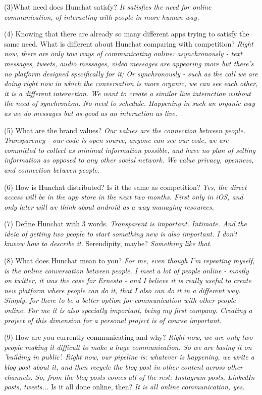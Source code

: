 \documentclass[11pt]{article}
\begin{document}
(3)What need does Hunchat satisfy? \textit{It satisfies the need for online communication, of interacting with people in more human way.}

(4) Knowing that there are already so many different apps trying to satisfy the same need. What is different about Hunchat comparing with competition?  \textit{Right now, there are only tow ways of communicating online: asynchronously - text messages, tweets, audio messages, video messages are appearing more but there's no platform designed specifically for it; Or synchronously - such as the call we are doing right now in which the conversation is more organic, we can see each other, it is a different interaction. We want to create a similar live interaction without the need of synchronism. No need to schedule. Happening in such an organic way as we do messages but as good as an interaction as live. } 

(5) What are the brand values? \textit{Our values are the connection between people. Transparency - our code is open source, anyone can see our code, we are committed to collect as minimal information possible, and have no plan of selling information as opposed to any other social network. We value privacy, openness, and connection between people.}

(6) How is Hunchat distributed? Is it the same as competition? \textit{Yes, the direct access will be in the app store in the next two months. First only in iOS, and only later will we think about android as a way managing resources.}

(7) Define Hunchat with 3 words. \textit{Transparent is important. Intimate. And the ideia of getting two people to start something new is also important. I don't knwow how to describe it.} Serendipity, maybe? \textit{Something like that.}

(8) What does Hunchat mean to you? \textit{For me, even though I'm repeating myself, is the online conversation between people. I meet a lot of people online - mostly on twitter, it was the case for Ernesto - and I believe it is really useful to create new platform where people can do it, that I also can do it in a different way. Simply, for there to be a better option for communication with other people online. For me it is also specially important, being my first company. Creating a project of this dimension for a personal project is of course important.}

(9) How are you currently communicating and why? \textit{Right now, we are only two people making it difficult to make a huge communication. So we are basing it on 'building in public'. Right now, our pipeline is: whatever is happening, we write a blog post about it, and then recycle the blog post in other content across other channels. So, from the blog posts comes all of the rest: Instagram posts, LinkedIn posts, tweets...} Is it all done online, then? \textit{It is all online communication, yes.}
\end{document}
